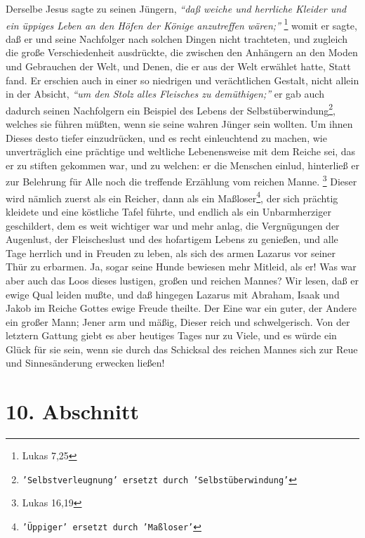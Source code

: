 Derselbe Jesus sagte
zu seinen Jüngern,
\textit{"`daß weiche und herrliche Kleider und ein üppiges Leben an
den Höfen der Könige anzutreffen wären;"'}
\footnote{Lukas 7,25}
womit er sagte,
daß er und seine Nachfolger nach solchen Dingen nicht trachteten, und zugleich
die große Verschiedenheit ausdrückte, die zwischen den Anhängern an den Moden
und Gebrauchen der Welt, und Denen, die er aus der Welt erwählet hatte, Statt
fand. Er erschien auch in einer so niedrigen und verächtlichen Gestalt, nicht
allein in der Absicht,
\textit{"`um den Stolz alles Fleisches zu demüthigen;"'} er gab
auch dadurch seinen Nachfolgern ein Beispiel des Lebens der Selbstüberwindung\footnote{\texttt{'Selbstverleugnung' ersetzt durch 'Selbstüberwindung'}},
welches sie führen müßten, wenn sie seine wahren Jünger sein wollten. Um ihnen
Dieses desto tiefer einzudrücken, und es recht einleuchtend zu machen, wie
unverträglich eine prächtige und weltliche Lebenensweise mit dem Reiche sei, das
er zu stiften gekommen war, und zu welchen: er die Menschen einlud, hinterließ
er zur Belehrung für Alle noch die treffende Erzählung vom reichen
Manne.
\footnote{Lukas 16,19}
Dieser wird nämlich zuerst als ein Reicher, dann als
ein Maßloser\footnote{\texttt{'Üppiger' ersetzt durch 'Maßloser'}}, der sich prächtig kleidete und eine köstliche Tafel führte, und
endlich als ein Unbarmherziger geschildert, dem es weit wichtiger war und mehr
anlag, die Vergnügungen der Augenlust, der Fleischeslust und des hofartigem
Lebens zu genießen, und alle Tage herrlich und in Freuden zu leben, als sich des
armen Lazarus vor seiner Thür zu erbarmen. Ja, sogar seine Hunde bewiesen mehr
Mitleid, als er! Was war aber auch das Loos dieses lustigen, großen und reichen
Mannes? Wir lesen, daß er ewige Qual leiden mußte, und daß hingegen Lazarus mit
Abraham, Isaak und Jakob im Reiche Gottes ewige Freude theilte. Der Eine war ein
guter, der Andere ein großer Mann; Jener arm und mäßig, Dieser reich und
schwelgerisch. Von der letztern Gattung giebt es aber heutiges Tages nur zu
Viele, und es würde ein Glück für sie sein, wenn sie durch das Schicksal des
reichen Mannes sich zur Reue und Sinnesänderung erwecken ließen!

\section{10. Abschnitt} \label{kap14_ab10}

